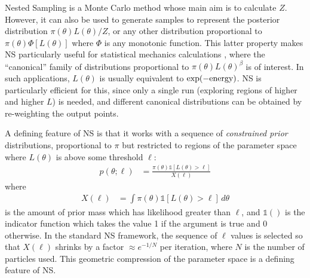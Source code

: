\documentclass[article]{jss}
\begin{document}
Nested Sampling \citep[NS;][]{skilling} is a Monte Carlo method whose main
aim is to calculate $Z$. However, it can also be used to generate samples
to represent the posterior distribution $\pi(\theta)L(\theta)/Z$, or
any other distribution proportional to
$\pi(\theta)\Phi\left[L(\theta)\right]$ where $\Phi$ is any monotonic function.
This latter property makes NS particularly useful for statistical mechanics
calculations \citep{2009arXiv0906.3544P, 2015arXiv150303404B}, where the
``canonical'' family of distributions proportional to
$\pi(\theta)L(\theta)^\beta$ is of interest. In such applications,
$L(\theta)$ is usually equivalent to
$\exp(-\textnormal{energy})$. NS is particularly efficient for this, since
only a single run (exploring regions of higher and higher $L$) is needed, and different canonical
distributions can be obtained by re-weighting the output points.

A defining feature of NS is that it works with a sequence of
{\em constrained prior} distributions, proportional to $\pi$ but
restricted to regions of the parameter space where $L(\theta)$
is above some threshold $\ell$:
\begin{align}
p(\theta; \ell) &=
\frac{\pi(\theta)\mathds{1}\left[L(\theta) > \ell\right]}{X(\ell)}
\label{eqn:constrained_prior}
\end{align}
where
\begin{align}
X(\ell) &= \int \pi(\theta) \mathds{1}\left[L(\theta) > \ell\right] \, d\theta
\end{align}
is the amount of prior mass which has likelihood greater than $\ell$, and
$\mathds{1}()$ is the indicator function which takes the value 1 if the
argument is true and 0 otherwise.
In the standard NS framework, the sequence of $\ell$ values is selected
so that $X(\ell)$ shrinks by a factor $\approx e^{-1/N}$ per iteration, where
$N$ is the number of particles used. This geometric compression of the
parameter space is a defining feature of NS.
\end{document}
